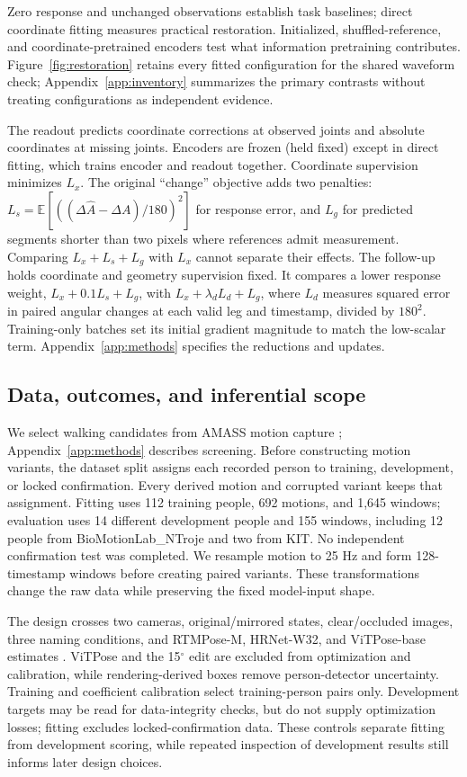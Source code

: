 \documentclass{article}
\newcommand{\dg}{^{\circ}}
\newcommand{\E}{\mathbb{E}}
\begin{document}
Zero response and unchanged observations establish task baselines; direct coordinate fitting measures practical restoration. Initialized, shuffled-reference, and coordinate-pretrained encoders test what information pretraining contributes. Figure~\ref{fig:restoration} retains every fitted configuration for the shared waveform check; Appendix~\ref{app:inventory} summarizes the primary contrasts without treating configurations as independent evidence.

The readout predicts coordinate corrections at observed joints and absolute coordinates at missing joints. Encoders are frozen (held fixed) except in direct fitting, which trains encoder and readout together. Coordinate supervision minimizes $L_x$. The original ``change'' objective adds two penalties: $L_s=\E[((\Delta\widehat A-\Delta A)/180)^2]$ for response error, and $L_g$ for predicted segments shorter than two pixels where references admit measurement. Comparing $L_x+L_s+L_g$ with $L_x$ cannot separate their effects. The follow-up holds coordinate and geometry supervision fixed. It compares a lower response weight, $L_x+0.1L_s+L_g$, with $L_x+\lambda_dL_d+L_g$, where $L_d$ measures squared error in paired angular changes at each valid leg and timestamp, divided by $180^2$. Training-only batches set its initial gradient magnitude to match the low-scalar term. Appendix~\ref{app:methods} specifies the reductions and updates.

\subsection{Data, outcomes, and inferential scope}
We select walking candidates from AMASS motion capture \citep{mahmood2019amass}; Appendix~\ref{app:methods} describes screening. Before constructing motion variants, the dataset split assigns each recorded person to training, development, or locked confirmation. Every derived motion and corrupted variant keeps that assignment. Fitting uses 112 training people, 692 motions, and 1,645 windows; evaluation uses 14 different development people and 155 windows, including 12 people from BioMotionLab\_NTroje and two from KIT. No independent confirmation test was completed. We resample motion to 25 Hz and form 128-timestamp windows before creating paired variants. These transformations change the raw data while preserving the fixed model-input shape.

The design crosses two cameras, original/mirrored states, clear/occluded images, three naming conditions, and RTMPose-M, HRNet-W32, and ViTPose-base estimates \citep{jiang2023rtmpose,sun2019hrnet,xu2022vitpose}. ViTPose and the 15$\dg$ edit are excluded from optimization and calibration, while rendering-derived boxes remove person-detector uncertainty. Training and coefficient calibration select training-person pairs only. Development targets may be read for data-integrity checks, but do not supply optimization losses; fitting excludes locked-confirmation data. These controls separate fitting from development scoring, while repeated inspection of development results still informs later design choices.
\end{document}
